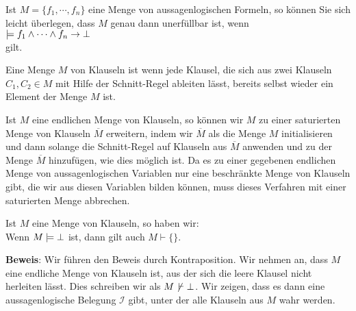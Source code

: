 \remark 
Ist $M = \{ f_1, \cdots, f_n \}$ eine Menge von aussagenlogischen Formeln, so können Sie sich leicht überlegen, dass
$M$ genau dann unerfüllbar ist, wenn
\\[0.2cm]
\hspace*{1.3cm}
$\models f_1 \wedge \cdots \wedge f_n \rightarrow \bot$
\\[0.2cm]
gilt. \eox

\begin{Definition}
  Eine Menge $M$ von Klauseln ist   wenn jede Klausel, die sich aus zwei
  Klauseln $C_1,C_2 \in M$ mit Hilfe der Schnitt-Regel ableiten lässt, bereits selbst wieder ein Element der
  Menge $M$ ist.
\end{Definition}

\remark
Ist $M$ eine endlichen Menge von Klauseln, so können wir $M$ zu einer saturierten Menge von Klauseln
$\overline{M}$ erweitern, indem wir $\overline{M}$ als die Menge $M$ initialisieren und dann solange die
Schnitt-Regel auf Klauseln aus $\overline{M}$ anwenden und zu der Menge $\overline{M}$ hinzufügen, wie dies möglich
ist. Da es zu einer gegebenen endlichen Menge von aussagenlogischen Variablen nur eine beschränkte Menge von
Klauseln gibt, die wir aus diesen Variablen bilden können, muss dieses Verfahren mit einer saturierten Menge
abbrechen. \eox

\begin{Satz} \label{widerlegungs-vollstaendig}
  Ist  $M$ eine Menge von Klauseln,
  so haben wir:
  \\[0.2cm]
  \hspace*{1.3cm} 
  Wenn $M \models \bot$ ist, dann gilt auch  $M \vdash \{\}$.
\end{Satz}

\noindent
\textbf{Beweis}:  Wir führen den Beweis durch
Kontraposition.  Wir nehmen an, dass $M$ eine endliche Menge von Klauseln ist, aus der sich die leere Klausel
nicht herleiten lässt.  Dies schreiben wir als $M \not\,\vdash \bot$.
Wir zeigen, dass es dann eine aussagenlogische Belegung $\mathcal{I}$ gibt, unter der
alle Klauseln aus $M$ wahr werden.

